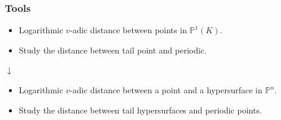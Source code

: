 \documentclass{beamer}
\def\jump{ \quad \\ \vspace{0.5cm} \pause}
\def\PP{{\mathbb P}}
\def\pp{{\mathfrak p}}
\theoremstyle{thmstyle}
\theoremstyle{mystyle}
\theoremstyle{qstnstyle}
\begin{document}

\begin{frame}
\frametitle{Tools}
\begin{itemize}
\item Logarithmic $v$-adic distance between points in $\PP^1(K)$.

\vspace{5mm}

\item Study the distance between tail point and periodic.
\end{itemize}

\begin{center}
{\Huge{$\downarrow$}}
\end{center}


\begin{itemize}
\item Logarithmic $v$-adic distance between a point and a hypersurface in $\PP^n$.

\vspace{5mm}
\item Study the distance between tail hypersurfaces and periodic points.

\end{itemize}
\end{frame}
\end{document}
